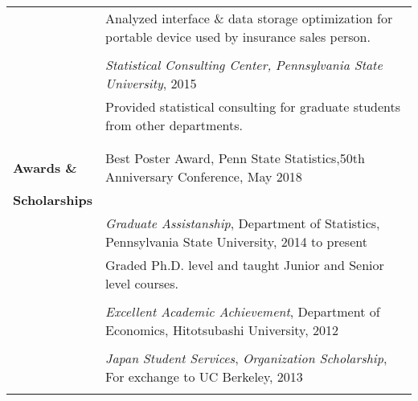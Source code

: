 \documentclass[utf8,letterpaper,oneside]{article}
\begin{document}
\begin{center}
\begin{tabular}{l l}
                         & Analyzed interface \& data storage optimization for portable device used by insurance sales person.   \\
                         &                                                                                                       \\
                         & \textit{Statistical Consulting Center,} \textit{Pennsylvania State University}, 2015                  \\
                         & Provided statistical consulting for graduate students from other departments.                         \\
                         &                                                                                                       \\\hline
                         &                                                                                                       \\
  \textbf{Awards \&}     & Best Poster Award, Penn State Statistics,50th Anniversary Conference, May 2018                        \\
  \textbf{Scholarships}  &                                                                                                       \\
                         &                                                                                                       
  \textit{Graduate Assistanship}, Department of Statistics, Pennsylvania State University, 2014 to present                       \\
                         & Graded Ph.D. level and taught Junior and Senior level courses.                                        \\
                         &                                                                                                       \\
                         & \textit{Excellent Academic Achievement}, Department of Economics, Hitotsubashi University, 2012       \\
                         &                                                                                                       \\
                         & \textit{Japan Student Services}, \textit{Organization Scholarship}, For exchange to UC Berkeley, 2013 \\
                         &                                                                                                       \\ \hline

\end{tabular}
\end{center}
\end{document}
